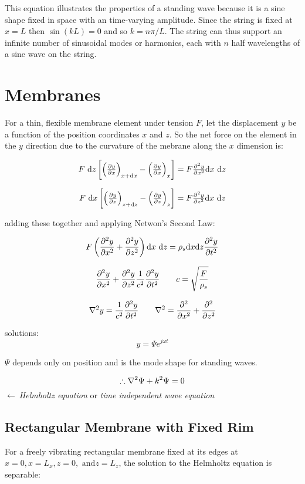 \documentclass[10pt, a4paper, twocolumn]{article}
\newcommand{\larr}{\ensuremath{\longleftarrow\ }}
\begin{document}
This equation illustrates the properties of a standing wave because it is a sine shape fixed in space with an time-varying amplitude. Since the string is fixed at $x=L$ then $\sin (kL) = 0$ and so $k = n \pi /L $. The string can thus support an infinite number of sinusoidal modes or harmonics, each with $n$ half wavelengths of a sine wave on the string.

\section{Membranes}

For a thin, flexible membrane element under tension $F$, let the displacement $y$ be a function of the position coordinates $x$ and $z$. So the net force on the element in the $y$ direction due to the curvature of the mebrane along the $x$ dimension is:

\[ \textstyle F \ \dd z \left[
\left( \pdv{y}{x} \right) _{x + \dd x}
- \left( \pdv{y}{x} \right) _x \right]
= F \pdv[2]{y}{x} \dd x\ \dd z \]

\[ \textstyle F \ \dd x \left[
\left( \pdv{y}{z} \right) _{z + \dd z}
- \left( \pdv{y}{z} \right) _z \right]
= F \pdv[2]{y}{z} \dd x\ \dd z \]

adding these together and applying Netwon's Second Law:

\[ F \left( \pdv[2]{y}{x} + \pdv[2]{y}{z} \right) \dd x \ \dd z
= \rho _s \dd x \dd z \pdv[2]{y}{t} \]

\[ \pdv[2]{y}{x} + \pdv[2]{y}{z} \frac{1}{c^2} \pdv[2]{y}{t}
\qquad c= \sqrt{\frac{F}{\rho _s}} \]

\[ \laplacian{y} = \frac{1}{c^2} \pdv[2]{y}{t}
\qquad \laplacian = \pdv[2]{x} + \pdv[2]{z} \]

solutions:
\[ y = \Psi e^{j \omega t} \]

$\Psi$ depends only on position and is the mode shape for standing waves.

\[ \therefore \laplacian{\Psi} + k^2 \Psi = 0 \]
\larr \emph{Helmholtz equation} or \emph{time independent wave equation}

\subsection{Rectangular Membrane with Fixed Rim}

For a freely vibrating rectangular membrane fixed at its edges at $ x=0, x=L_x, z=0, \text{ and} z=L_z $, the solution to the Helmholtz equation is separable:
\end{document}
